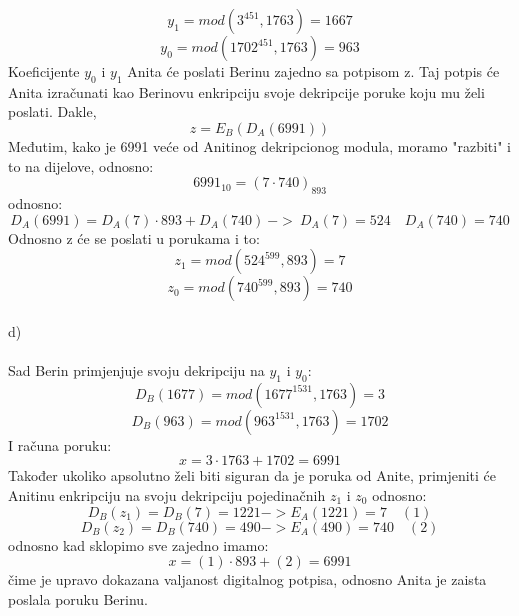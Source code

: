 \documentclass[12pt]{article}
\begin{document}
\begin{enumerate}
\begin{equation*}
    y_1 = mod(3^{451}, 1763) = 1667
\end{equation*}
\begin{equation*}
    y_0 = mod(1702^{451}, 1763) = 963
\end{equation*}
Koeficijente $y_0$ i $y_1$ Anita će poslati Berinu zajedno sa potpisom z. Taj potpis će Anita
izračunati kao Berinovu enkripciju svoje dekripcije poruke koju mu želi poslati. Dakle,
\begin{equation*}
    z = E_B(D_A(6991))
\end{equation*}
Međutim, kako je 6991 veće od Anitinog dekripcionog modula, moramo "razbiti" i to na dijelove, odnosno:
\begin{equation*}
   6991_{10} = (7 \cdot 740)_{893}
\end{equation*}
odnosno:
\begin{equation*}
   D_A(6991) = D_A(7) \cdot {893} + D_A(740) ~ -> ~ D_A(7) = 524 \quad D_A(740) = 740
\end{equation*}
Odnosno z će se poslati u porukama i to:
\begin{equation*}
    z_1 = mod(524^{599}, 893) = 7
\end{equation*}
\begin{equation*}
    z_0 = mod(740^{599}, 893) = 740
\end{equation*}
\\
\newpage
d) \\
\\
Sad Berin primjenjuje svoju dekripciju na $y_1$ i $y_0$:
\begin{equation*}
   D_B(1677) = mod(1677^{1531}, 1763) = 3
\end{equation*}
\begin{equation*}
   D_B(963) = mod(963^{1531}, 1763) = 1702
\end{equation*}
I računa poruku:
\begin{equation*}
   x = 3 \cdot 1763 + 1702 = 6991
\end{equation*}
Također ukoliko apsolutno želi biti siguran da je poruka od Anite, primjeniti
će Anitinu enkripciju na svoju dekripciju pojedinačnih $z_1$ i $z_0$ odnosno:
\begin{equation*}
    D_B(z_1) = D_B(7) = 1221 -> E_A(1221) = 7 \quad (1)
\end{equation*}
\begin{equation*}
    D_B(z_2) = D_B(740) = 490 -> E_A(490) = 740 \quad (2)
\end{equation*}
odnosno kad sklopimo sve zajedno imamo:
\begin{equation*}
    x = (1) \cdot 893 + (2) = 6991
\end{equation*}
čime je upravo dokazana valjanost digitalnog potpisa, odnosno Anita je zaista poslala
	poruku Berinu.
	\end{enumerate}
	
	
	
	
    
\end{document}
